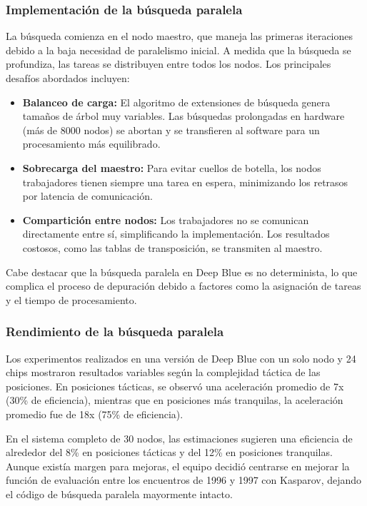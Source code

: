 \documentclass[12pt,a4paper]{article}
\begin{document}
\subsubsection*{Implementación de la búsqueda paralela}
La búsqueda comienza en el nodo maestro, que maneja las primeras iteraciones debido a la baja necesidad de paralelismo inicial. A medida que la búsqueda se profundiza, las tareas se distribuyen entre todos los nodos. Los principales desafíos abordados incluyen:
\begin{itemize}
    \item \textbf{Balanceo de carga:} El algoritmo de extensiones de búsqueda genera tamaños de árbol muy variables. Las búsquedas prolongadas en hardware (más de 8000 nodos) se abortan y se transfieren al software para un procesamiento más equilibrado.
    \item \textbf{Sobrecarga del maestro:} Para evitar cuellos de botella, los nodos trabajadores tienen siempre una tarea en espera, minimizando los retrasos por latencia de comunicación.
    \item \textbf{Compartición entre nodos:} Los trabajadores no se comunican directamente entre sí, simplificando la implementación. Los resultados costosos, como las tablas de transposición, se transmiten al maestro.
\end{itemize}

Cabe destacar que la búsqueda paralela en Deep Blue es no determinista, lo que complica el proceso de depuración debido a factores como la asignación de tareas y el tiempo de procesamiento.

\subsubsection*{Rendimiento de la búsqueda paralela}
Los experimentos realizados en una versión de Deep Blue con un solo nodo y 24 chips mostraron resultados variables según la complejidad táctica de las posiciones. En posiciones tácticas, se observó una aceleración promedio de 7x (30\% de eficiencia), mientras que en posiciones más tranquilas, la aceleración promedio fue de 18x (75\% de eficiencia).

En el sistema completo de 30 nodos, las estimaciones sugieren una eficiencia de alrededor del 8\% en posiciones tácticas y del 12\% en posiciones tranquilas. Aunque existía margen para mejoras, el equipo decidió centrarse en mejorar la función de evaluación entre los encuentros de 1996 y 1997 con Kasparov, dejando el código de búsqueda paralela mayormente intacto.
\end{document}
